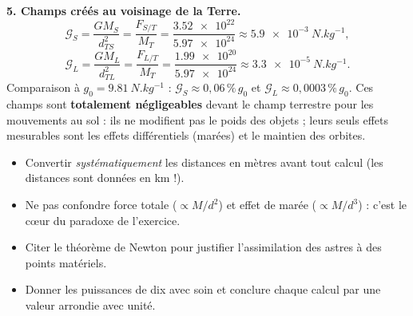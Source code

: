 \documentclass[11pt]{article}
\begin{document}
\begin{corrige}
\textbf{5. Champs créés au voisinage de la Terre.}
\[
\mathcal{G}_S = \frac{G M_S}{d_{TS}^2} = \frac{F_{S/T}}{M_T} = \frac{\num{3,52e22}}{\num{5,97e24}} \approx \SI{5,9e-3}{N.kg^{-1}},
\]
\[
\mathcal{G}_L = \frac{G M_L}{d_{TL}^2} = \frac{F_{L/T}}{M_T} = \frac{\num{1,99e20}}{\num{5,97e24}} \approx \SI{3,3e-5}{N.kg^{-1}}.
\]
Comparaison à $g_0 = \SI{9,81}{N.kg^{-1}}$ : $\mathcal{G}_S \approx 0,06\,\%\,g_0$ et $\mathcal{G}_L \approx 0,0003\,\%\,g_0$. Ces champs sont \textbf{totalement négligeables} devant le champ terrestre pour les mouvements au sol : ils ne modifient pas le poids des objets ; leurs seuls effets mesurables sont les effets différentiels (marées) et le maintien des orbites.

\begin{attention}
\begin{itemize}
\item Convertir \emph{systématiquement} les distances en mètres avant tout calcul (les distances sont données en km !).
\item Ne pas confondre force totale ($\propto M/d^2$) et effet de marée ($\propto M/d^3$) : c'est le cœur du paradoxe de l'exercice.
\item Citer le théorème de Newton pour justifier l'assimilation des astres à des points matériels.
\item Donner les puissances de dix avec soin et conclure chaque calcul par une valeur arrondie avec unité.
\end{itemize}
\end{attention}
\end{corrige}
\end{document}
